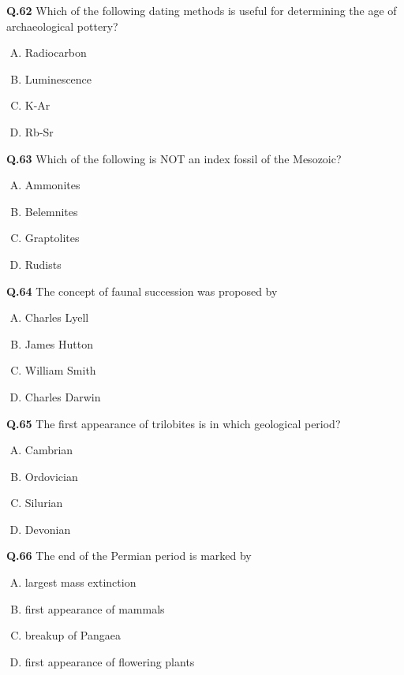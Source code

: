 \textbf{Q.62} Which of the following dating methods is useful for determining the age of archaeological pottery?
\begin{enumerate}[(A)]
    \item Radiocarbon
    \item Luminescence
    \item K-Ar
    \item Rb-Sr
\end{enumerate}

\textbf{Q.63} Which of the following is NOT an index fossil of the Mesozoic?
\begin{enumerate}[(A)]
    \item Ammonites
    \item Belemnites
    \item Graptolites
    \item Rudists
\end{enumerate}

\textbf{Q.64} The concept of faunal succession was proposed by
\begin{multicols}{4}
    

\begin{enumerate}[(A)]
    \item Charles Lyell
    \item James Hutton
    \item William Smith
    \item Charles Darwin
\end{enumerate}
\end{multicols}
\textbf{Q.65} The first appearance of trilobites is in which geological period?
\begin{enumerate}[(A)]
    \item Cambrian
    \item Ordovician
    \item Silurian
    \item Devonian
\end{enumerate}

\textbf{Q.66} The end of the Permian period is marked by
\begin{enumerate}[(A)]
    \item largest mass extinction
    \item first appearance of mammals
    \item breakup of Pangaea
    \item first appearance of flowering plants
\end{enumerate}

